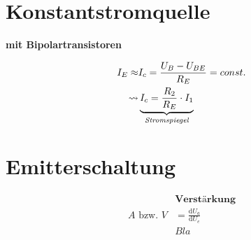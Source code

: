 \section*{Konstantstromquelle}
\textbf{mit Bipolartransistoren}

\begin{multicols}{2}
	
	\begin{center}
		
	\end{center}
	
	\begin{align*}
		I_E \approx &I_c = \frac{U_B - U_{BE}}{R_E} = const.
		\\
		   \leadsto  &\underbrace{I_c = \frac{R_2}{R_E} \cdot I_1}_\emph{Stromspiegel} 
	\end{align*}

\end{multicols}

\section*{Emitterschaltung}

\begin{multicols}{2}
			
	\begin{center}
		
	\end{center}
	
	\begin{align*}
		&\textbf{Verstärkung}
		\\
		A \text{ bzw. } V &= \frac{\mathrm{d}U_a}{\mathrm{d}U_e}
		\\
		&Bla
	\end{align*}	
		
\end{multicols}